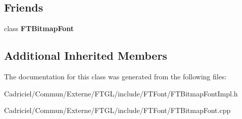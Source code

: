 \subsection*{Friends}
\begin{DoxyCompactItemize}
\item 
class {\bfseries F\+T\+Bitmap\+Font}\hypertarget{class_f_t_bitmap_font_impl_a7ba5a198d501799828a37b4b808b9352}{}\label{class_f_t_bitmap_font_impl_a7ba5a198d501799828a37b4b808b9352}

\end{DoxyCompactItemize}
\subsection*{Additional Inherited Members}


The documentation for this class was generated from the following files\+:\begin{DoxyCompactItemize}
\item 
Cadriciel/\+Commun/\+Externe/\+F\+T\+G\+L/include/\+F\+T\+Font/F\+T\+Bitmap\+Font\+Impl.\+h\item 
Cadriciel/\+Commun/\+Externe/\+F\+T\+G\+L/include/\+F\+T\+Font/F\+T\+Bitmap\+Font.\+cpp\end{DoxyCompactItemize}
